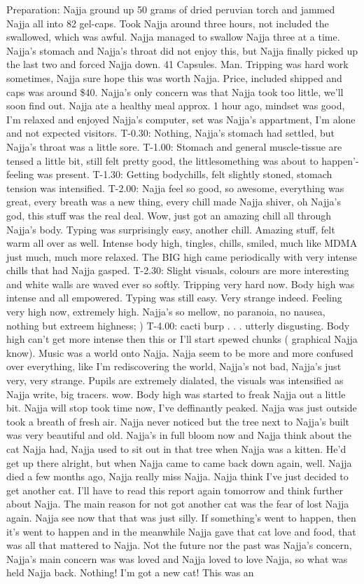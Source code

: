 \documentclass[12pt]{book}
\begin{document}
Preparation: Najja ground up 50 grams of dried peruvian torch and jammed Najja all into 82 gel-caps. Took Najja around three hours, not included the swallowed, which was awful. Najja managed to swallow Najja three at a time. Najja's stomach and Najja's throat did not enjoy this, but Najja finally picked up the last two and forced Najja down. 41 Capsules. Man. Tripping was hard work sometimes, Najja sure hope this was worth Najja. Price, included shipped and caps was around \$40. Najja's only concern was that Najja took too little, we'll soon find out. Najja ate a healthy meal approx. 1 hour ago, mindset was good, I'm relaxed and enjoyed Najja's computer, set was Najja's appartment, I'm alone and not expected visitors. T-0.30: Nothing, Najja's stomach had settled, but Najja's throat was a little sore. T-1.00: Stomach and general muscle-tissue are tensed a little bit, still felt pretty good, the littlesomething was about to happen'-feeling was present. T-1.30: Getting bodychills, felt slightly stoned, stomach tension was intensified. T-2.00: Najja feel so good, so awesome, everything was great, every breath was a new thing, every chill made Najja shiver, oh Najja's god, this stuff was the real deal. Wow, just got an amazing chill all through Najja's body. Typing was surprisingly easy, another chill. Amazing stuff, felt warm all over as well. Intense body high, tingles, chills, smiled, much like MDMA just much, much more relaxed. The BIG high came periodically with very intense chills that had Najja gasped. T-2.30: Slight visuals, colours are more interesting and white walls are waved ever so softly. Tripping very hard now. Body high was intense and all empowered. Typing was still easy. Very strange indeed. Feeling very high now, extremely high. Najja's so mellow, no paranoia, no nausea, nothing but extreem highness; ) T-4.00: cacti burp . . .  utterly disgusting. Body high can't get more intense then this or I'll start spewed chunks ( graphical Najja know). Music was a world onto Najja. Najja seem to be more and more confused over everything, like I'm rediscovering the world, Najja's not bad, Najja's just very, very strange. Pupils are extremely dialated, the visuals was intensified as Najja write, big tracers. wow. Body high was started to freak Najja out a little bit. Najja will stop took time now, I've deffinantly peaked. Najja was just outside took a breath of fresh air. Najja never noticed but the tree next to Najja's built was very beautiful and old. Najja's in full bloom now and Najja think about the cat Najja had, Najja used to sit out in that tree when Najja was a kitten. He'd get up there alright, but when Najja came to came back down again, well. Najja died a few months ago, Najja really miss Najja. Najja think I've just decided to get another cat. I'll have to read this report again tomorrow and think further about Najja. The main reason for not got another cat was the fear of lost Najja again. Najja see now that that was just silly. If something's went to happen, then it's went to happen and in the meanwhile Najja gave that cat love and food, that was all that mattered to Najja. Not the future nor the past was Najja's concern, Najja's main concern was was loved and Najja loved to love Najja, so what was held Najja back. Nothing! I'm got a new cat! This was an 
\end{document}
